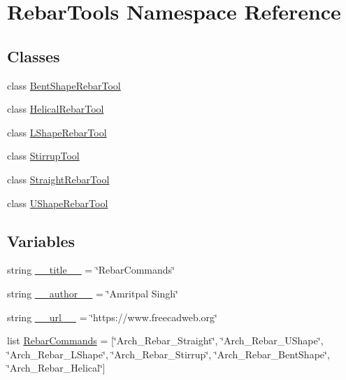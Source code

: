 \hypertarget{namespaceRebarTools}{}\section{Rebar\+Tools Namespace Reference}
\label{namespaceRebarTools}
\subsection*{Classes}
\begin{DoxyCompactItemize}
\item 
class \hyperlink{classRebarTools_1_1BentShapeRebarTool}{Bent\+Shape\+Rebar\+Tool}
\item 
class \hyperlink{classRebarTools_1_1HelicalRebarTool}{Helical\+Rebar\+Tool}
\item 
class \hyperlink{classRebarTools_1_1LShapeRebarTool}{L\+Shape\+Rebar\+Tool}
\item 
class \hyperlink{classRebarTools_1_1StirrupTool}{Stirrup\+Tool}
\item 
class \hyperlink{classRebarTools_1_1StraightRebarTool}{Straight\+Rebar\+Tool}
\item 
class \hyperlink{classRebarTools_1_1UShapeRebarTool}{U\+Shape\+Rebar\+Tool}
\end{DoxyCompactItemize}
\subsection*{Variables}
\begin{DoxyCompactItemize}
\item 
string \hyperlink{namespaceRebarTools_a4e380bda06a3907d50e62c4d39b18109}{\+\_\+\+\_\+title\+\_\+\+\_\+} = \char`\"{}Rebar\+Commands\char`\"{}
\item 
string \hyperlink{namespaceRebarTools_a9b758bc71542f069b1d43d0492dfeb35}{\+\_\+\+\_\+author\+\_\+\+\_\+} = \char`\"{}Amritpal Singh\char`\"{}
\item 
string \hyperlink{namespaceRebarTools_ad4d82f49272a3af7991667bf0c7d6998}{\+\_\+\+\_\+url\+\_\+\+\_\+} = \char`\"{}https\+://www.\+freecadweb.\+org\char`\"{}
\item 
list \hyperlink{namespaceRebarTools_ad80a0d98e5b180cb5f37b3d3702d4d4d}{Rebar\+Commands} = \mbox{[}\char`\"{}Arch\+\_\+\+Rebar\+\_\+\+Straight\char`\"{}, \char`\"{}Arch\+\_\+\+Rebar\+\_\+\+U\+Shape\char`\"{}, \char`\"{}Arch\+\_\+\+Rebar\+\_\+\+L\+Shape\char`\"{}, \char`\"{}Arch\+\_\+\+Rebar\+\_\+\+Stirrup\char`\"{}, \char`\"{}Arch\+\_\+\+Rebar\+\_\+\+Bent\+Shape\char`\"{}, \char`\"{}Arch\+\_\+\+Rebar\+\_\+\+Helical\char`\"{}\mbox{]}
\end{DoxyCompactItemize}


